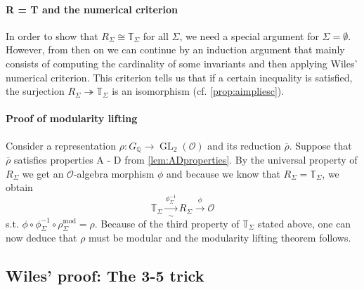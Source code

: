 \documentclass{article}
\theoremstyle{plain}%
\theoremstyle{definition}
\theoremstyle{remark}
\newcommand{\GL}{\operatorname{GL}}
\begin{document}
\paragraph{R = T and the numerical criterion}
In order to show that \(R_\Sigma \cong \mathbb{T}_\Sigma\) for all \(\Sigma\), we need a special argument for
\(\Sigma = \emptyset\). However, from then on we can continue by an induction argument that mainly consists of 
computing the cardinality of some invariants and then applying Wiles' numerical criterion.
This criterion tells us that if a certain inequality is satisfied, the surjection 
\(R_\Sigma \twoheadrightarrow \mathbb{T}_\Sigma\) is an isomorphism (cf. \cref{prop:aimpliesc}).

\paragraph{Proof of modularity lifting}
Consider a representation \(\rho \colon G_\mathbb{Q} \to \GL_2(\mathcal{O})\) and its reduction \(\overline{\rho}\).
Suppose that \(\overline{\rho}\) satisfies properties A - D from \cref{lem:ADproperties}.
By the universal property of \(R_\Sigma\) we get an \(\mathcal{O}\)-algebra morphism \(\phi\) and 
because we know that \(R_\Sigma = \mathbb{T}_\Sigma\), we obtain
\[
    \mathbb{T}_\Sigma \xrightarrow[\sim]{\phi_\Sigma^{-1}} R_\Sigma \xrightarrow{\phi} \mathcal{O}  
\]
s.t. \(\phi \circ \phi_\Sigma^{-1} \circ \rho_\Sigma^\mathrm{mod} = \rho\).
Because of the third property of \(\mathbb{T}_\Sigma\) stated above,
one can now deduce that \(\rho\) must be modular and the modularity lifting theorem follows.

\subsection{Wiles' proof: The 3-5 trick}
\end{document}
